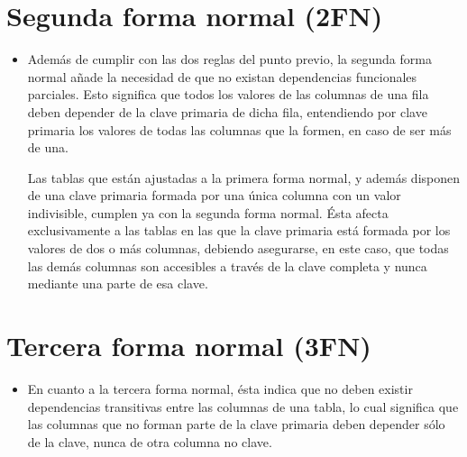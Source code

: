 \documentclass{report}
\begin{document}
	\section{Segunda forma normal (2FN)}
	\begin{itemize}
	\item  Además de cumplir con las dos reglas del punto previo, la segunda forma normal añade la 				necesidad de que no existan dependencias funcionales parciales. Esto significa que todos los valores 		de las columnas de una fila deben depender de la clave primaria de dicha fila, entendiendo por clave 		primaria los valores de todas las columnas que la formen, en caso de ser más de una.

	Las tablas que están ajustadas a la primera forma normal, y además disponen de una clave primaria 			formada por una única columna con un valor indivisible, cumplen ya con la segunda forma normal. Ésta 		afecta exclusivamente a las tablas en las que la clave primaria está formada por los valores de dos o 	más columnas, debiendo asegurarse, en este caso, que todas las demás columnas son accesibles a través 	de la clave completa y nunca mediante una parte de esa clave. 
	
	\end{itemize}
	
	\section{Tercera forma normal (3FN)}
	\begin{itemize}
	\item  En cuanto a la tercera forma normal, ésta indica que no deben existir dependencias transitivas 	entre las columnas de una tabla, lo cual significa que las columnas que no forman parte de la clave 		primaria deben depender sólo de la clave, nunca de otra columna no clave. 
	
	\end{itemize}
	
	\cite{coronel2011}
	
	 
	
	
	
	
	
	
\end{document}
